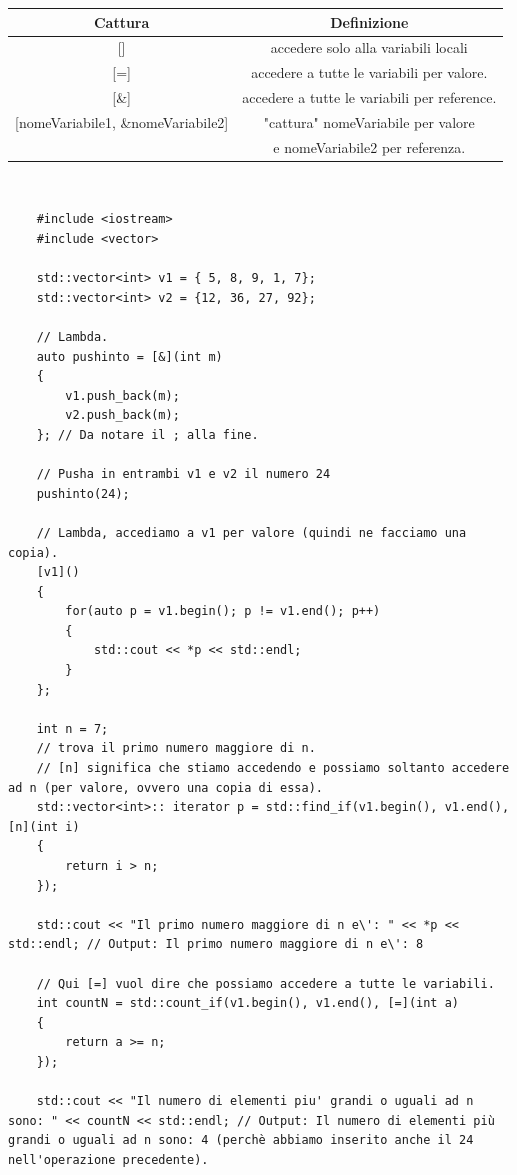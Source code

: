\begin{tabular}{|c|c|}
	\hline
	\textbf{Cattura} & \textbf{Definizione} \\
	\hline
	\textsf{\small []} & \textsf{\small accedere solo alla variabili locali} \\
	\hline
	\textsf{\small [=]} & \textsf{\small accedere a tutte le variabili per valore.} \\
	\hline
	\textsf{\small [\&]} & \textsf{\small accedere a tutte le variabili per reference.} \\
	\hline
	\textsf{\small [nomeVariabile1, \&nomeVariabile2]} & \textsf{\small "cattura" nomeVariabile per valore } \\
	\textsf{\small } & \textsf{\small e nomeVariabile2 per referenza.} \\
	\hline
\end{tabular} \\

\begin{lstlisting}
	#include <iostream>
	#include <vector>
	
	std::vector<int> v1 = { 5, 8, 9, 1, 7};
	std::vector<int> v2 = {12, 36, 27, 92};
	
	// Lambda.
	auto pushinto = [&](int m)
	{
		v1.push_back(m);
		v2.push_back(m);
	}; // Da notare il ; alla fine.

	// Pusha in entrambi v1 e v2 il numero 24
	pushinto(24);
	
	// Lambda, accediamo a v1 per valore (quindi ne facciamo una copia).
	[v1]()
	{
		for(auto p = v1.begin(); p != v1.end(); p++)
		{
			std::cout << *p << std::endl;
		}
	};

	int n = 7;
	// trova il primo numero maggiore di n.
	// [n] significa che stiamo accedendo e possiamo soltanto accedere ad n (per valore, ovvero una copia di essa).
	std::vector<int>:: iterator p = std::find_if(v1.begin(), v1.end(), [n](int i)
	{
		return i > n;
	});

	std::cout << "Il primo numero maggiore di n e\': " << *p << std::endl; // Output: Il primo numero maggiore di n e\': 8

	// Qui [=] vuol dire che possiamo accedere a tutte le variabili.
	int countN = std::count_if(v1.begin(), v1.end(), [=](int a) 
	{
		return a >= n;
	});

	std::cout << "Il numero di elementi piu' grandi o uguali ad n sono: " << countN << std::endl; // Output: Il numero di elementi più grandi o uguali ad n sono: 4 (perchè abbiamo inserito anche il 24 nell'operazione precedente).
\end{lstlisting}

